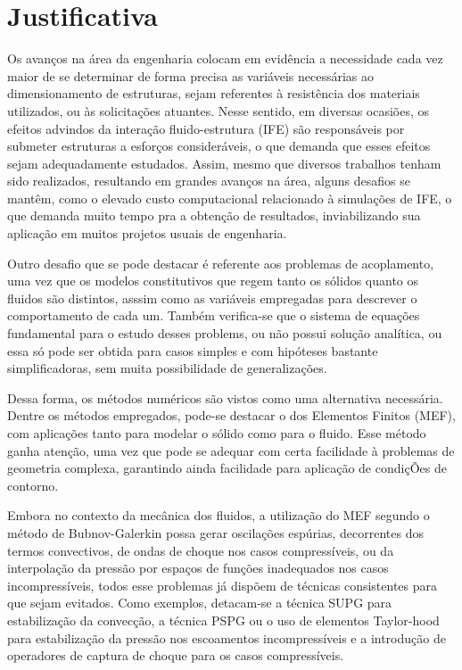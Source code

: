 \section{Justificativa}

Os avanços na área da engenharia colocam em evidência a necessidade cada vez maior de se determinar de forma precisa as variáveis necessárias ao dimensionamento de estruturas, sejam referentes à resistência dos materiais utilizados, ou às solicitações atuantes. Nesse sentido, em diversas ocasiões, os efeitos advindos da interação fluido-estrutura (IFE) são responsáveis por submeter estruturas a esforços consideráveis, o que demanda que esses efeitos sejam adequadamente estudados. Assim, mesmo que diversos trabalhos tenham sido realizados, resultando em grandes avanços na área, alguns desafios se mantêm, como o elevado custo computacional relacionado à simulações de IFE, o que demanda muito tempo pra a obtenção de resultados, inviabilizando sua aplicação em muitos projetos usuais de engenharia.

Outro desafio que se pode destacar é referente aos problemas de acoplamento, uma vez que os modelos constitutivos que regem tanto os sólidos quanto os fluidos são distintos, asssim como as variáveis empregadas para descrever o comportamento de cada um. Também verifica-se que o sistema de equações fundamental para o estudo desses problems, ou não possui solução analítica, ou essa só pode ser obtida para casos simples e com hipóteses bastante simplificadoras, sem muita possibilidade de generalizações.

Dessa forma, os métodos numéricos são vistos como uma alternativa necessária. Dentre os métodos empregados, pode-se destacar o dos Elementos Finitos (MEF), com aplicações tanto para modelar o sólido como para o fluido. Esse método ganha atenção, uma vez que pode se adequar com certa facilidade à problemas de geometria complexa, garantindo ainda facilidade para aplicação de condiçÕes de contorno.

Embora no contexto da mecânica dos fluidos, a utilização do MEF segundo o método de Bubnov-Galerkin possa gerar oscilações espúrias, decorrentes dos termos convectivos, de ondas de choque nos casos compressíveis, ou da interpolação da pressão por espaços de funções inadequados nos casos incompressíveis, todos esse problemas já dispõem de técnicas consistentes para que sejam evitados. Como exemplos, detacam-se a técnica SUPG para estabilização da convecção, a técnica PSPG ou o uso de elementos Taylor-hood para estabilização da pressão nos escoamentos incompressíveis e a introdução de operadores de captura de choque para os casos compressíveis. 

